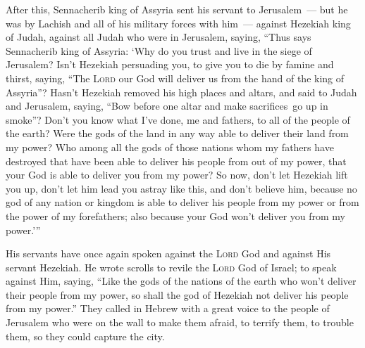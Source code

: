 \begin{inparaenum}
     After this, Sennacherib king of Assyria sent his servant to Jerusalem~--- but he was by Lachish and all of his military forces with him~--- against Hezekiah king of Judah, against all Judah who were in Jerusalem, saying,%
     ``Thus says Sennacherib king of Assyria: `Why do you trust and live in the siege of Jerusalem?%
     Isn't Hezekiah persuading you, to give you to die by famine and thirst, saying, ``The \textsc{Lord} our God will deliver us from the hand of the king of Assyria''?%
     Hasn't Hezekiah removed his high places and altars, and said to Judah and Jerusalem, saying, ``Bow before one altar and make sacrifices\understood\ go up in smoke''?%
     Don't you know what I've done, me and fathers, to all of the people of the earth? Were the gods of the land in any way able to deliver their land from my power?%
     Who among all the gods of those nations whom my fathers have destroyed that have been able to deliver his people from out of my power, that your God is able to deliver you from my power?%
     So now, don't let Hezekiah lift you up, don't let him lead you astray like this, and don't believe him, because no god of any nation or kingdom is able to deliver his people from my power or from the power of my forefathers; also because your God won't deliver you from my power.'\thinspace''%
    
     His servants have once again spoken against the \textsc{Lord} God and against His servant Hezekiah.%
     He wrote scrolls to revile the \textsc{Lord} God of Israel; to speak against Him, saying, ``Like the gods of the nations of the earth who won't deliver their people from my power, so shall the god of Hezekiah not deliver his people from my power.''%
     They called in Hebrew with a great voice to the people of Jerusalem who were on the wall to make them afraid, to terrify them, to trouble them, so they could capture the city.%
    

\end{inparaenum}
